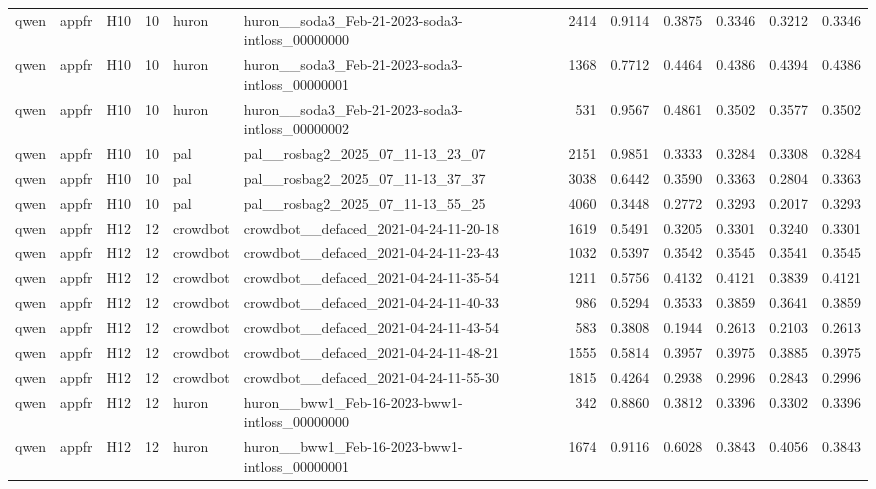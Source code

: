 \begin{table}[tbp]
\begin{tabular}{lllrllrrrrrr}
qwen & appfr & H10 & 10 & huron & huron\_\_soda3\_Feb-21-2023-soda3-intloss\_00000000 & 2414 & 0.9114 & 0.3875 & 0.3346 & 0.3212 & 0.3346 \\
qwen & appfr & H10 & 10 & huron & huron\_\_soda3\_Feb-21-2023-soda3-intloss\_00000001 & 1368 & 0.7712 & 0.4464 & 0.4386 & 0.4394 & 0.4386 \\
qwen & appfr & H10 & 10 & huron & huron\_\_soda3\_Feb-21-2023-soda3-intloss\_00000002 & 531 & 0.9567 & 0.4861 & 0.3502 & 0.3577 & 0.3502 \\
qwen & appfr & H10 & 10 & pal & pal\_\_rosbag2\_2025\_07\_11-13\_23\_07 & 2151 & 0.9851 & 0.3333 & 0.3284 & 0.3308 & 0.3284 \\
qwen & appfr & H10 & 10 & pal & pal\_\_rosbag2\_2025\_07\_11-13\_37\_37 & 3038 & 0.6442 & 0.3590 & 0.3363 & 0.2804 & 0.3363 \\
qwen & appfr & H10 & 10 & pal & pal\_\_rosbag2\_2025\_07\_11-13\_55\_25 & 4060 & 0.3448 & 0.2772 & 0.3293 & 0.2017 & 0.3293 \\
qwen & appfr & H12 & 12 & crowdbot & crowdbot\_\_defaced\_2021-04-24-11-20-18 & 1619 & 0.5491 & 0.3205 & 0.3301 & 0.3240 & 0.3301 \\
qwen & appfr & H12 & 12 & crowdbot & crowdbot\_\_defaced\_2021-04-24-11-23-43 & 1032 & 0.5397 & 0.3542 & 0.3545 & 0.3541 & 0.3545 \\
qwen & appfr & H12 & 12 & crowdbot & crowdbot\_\_defaced\_2021-04-24-11-35-54 & 1211 & 0.5756 & 0.4132 & 0.4121 & 0.3839 & 0.4121 \\
qwen & appfr & H12 & 12 & crowdbot & crowdbot\_\_defaced\_2021-04-24-11-40-33 & 986 & 0.5294 & 0.3533 & 0.3859 & 0.3641 & 0.3859 \\
qwen & appfr & H12 & 12 & crowdbot & crowdbot\_\_defaced\_2021-04-24-11-43-54 & 583 & 0.3808 & 0.1944 & 0.2613 & 0.2103 & 0.2613 \\
qwen & appfr & H12 & 12 & crowdbot & crowdbot\_\_defaced\_2021-04-24-11-48-21 & 1555 & 0.5814 & 0.3957 & 0.3975 & 0.3885 & 0.3975 \\
qwen & appfr & H12 & 12 & crowdbot & crowdbot\_\_defaced\_2021-04-24-11-55-30 & 1815 & 0.4264 & 0.2938 & 0.2996 & 0.2843 & 0.2996 \\
qwen & appfr & H12 & 12 & huron & huron\_\_bww1\_Feb-16-2023-bww1-intloss\_00000000 & 342 & 0.8860 & 0.3812 & 0.3396 & 0.3302 & 0.3396 \\
qwen & appfr & H12 & 12 & huron & huron\_\_bww1\_Feb-16-2023-bww1-intloss\_00000001 & 1674 & 0.9116 & 0.6028 & 0.3843 & 0.4056 & 0.3843 \\

\end{tabular}
\end{table}
